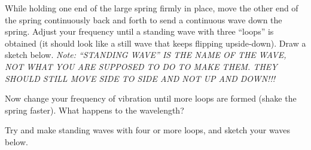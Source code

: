 \documentclass[10pt]{exam}
\begin{document}
\begin{questions}
  \question
    While holding one end of the large spring firmly in place, move the other end of the spring continuously back and forth to send a continuous wave down the spring.  Adjust your frequency until a standing wave with three ``loops'' is obtained (it should look like a still wave that keeps flipping upside-down).  Draw a sketch below.  \emph{ Note: ``STANDING WAVE'' IS THE NAME OF THE WAVE, NOT WHAT YOU ARE SUPPOSED TO DO TO MAKE THEM.  THEY SHOULD STILL MOVE SIDE TO SIDE AND NOT UP AND DOWN!!!}
  
  
  
  \question
    Now change your frequency of vibration until more loops are formed (shake the spring faster).  What happens to the wavelength?
    \vs
  
  
  \question
    Try and make standing waves with four or more loops, and sketch your waves below.
  


\end{questions}
\end{document}
